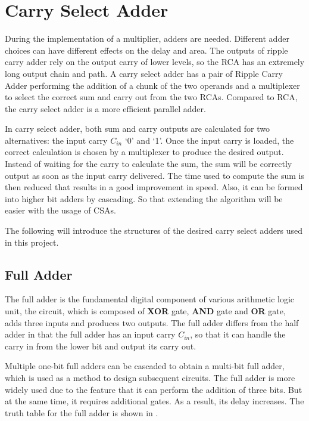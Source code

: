 \section{Carry Select Adder}

During the implementation of a multiplier, adders are needed. Different adder choices can have different effects on the delay and area.
The outputs of ripple carry adder rely on the output carry of lower levels, so the RCA has an extremely long output chain and path.
A carry select adder has a pair of Ripple Carry Adder performing the addition of a chunk of the two operands and a multiplexer to select the correct sum and carry out from the two RCAs.
Compared to RCA, the carry select adder is a more efficient parallel adder.

In carry select adder, both sum and carry outputs are calculated for two alternatives: the input carry \(C_{in}\) ‘0’ and ‘1’.
Once the input carry is loaded, the correct calculation is chosen by a multiplexer to produce the desired output.
Instead of waiting for the carry to calculate the sum, the sum will be correctly output as soon as the input carry delivered.
The time used to compute the sum is then reduced that results in a good improvement in speed.
Also, it can be formed into higher bit adders by cascading.
So that extending the algorithm will be easier with the usage of CSAs.

The following will introduce the structures of the desired carry select adders used in this project.


\subsection{Full Adder}

The full adder is the fundamental digital component of various arithmetic logic unit, the circuit,
which is composed of \textbf{XOR} gate, \textbf{AND} gate and \textbf{OR} gate, adds three inputs and produces two outputs.
The full adder differs from the half adder in that the full adder has an input carry \(C_{in}\),
so that it can handle the carry in from the lower bit and output its carry out.

Multiple one-bit full adders can be cascaded to obtain a multi-bit full adder,
which is used as a method to design subsequent circuits.
The full adder is more widely used due to the feature that it can perform the addition of three bits.
But at the same time, it requires additional gates. As a result, its delay increases.
The truth table for the full adder is shown in .

